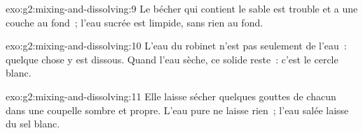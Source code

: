 \begin{solution}{exo:g2:mixing-and-dissolving:9}
Le bécher qui contient le sable est trouble et a une couche au fond~;
l'eau sucrée est limpide, sans rien au fond.
\end{solution}

\begin{solution}{exo:g2:mixing-and-dissolving:10}
L'eau du robinet n'est pas seulement de l'eau~: quelque chose y est
dissous. Quand l'eau sèche, ce solide reste~: c'est le cercle blanc.
\end{solution}

\begin{solution}{exo:g2:mixing-and-dissolving:11}
Elle laisse sécher quelques gouttes de chacun dans une coupelle sombre
et propre. L'eau pure ne laisse rien~; l'eau salée laisse du sel blanc.
\end{solution}
